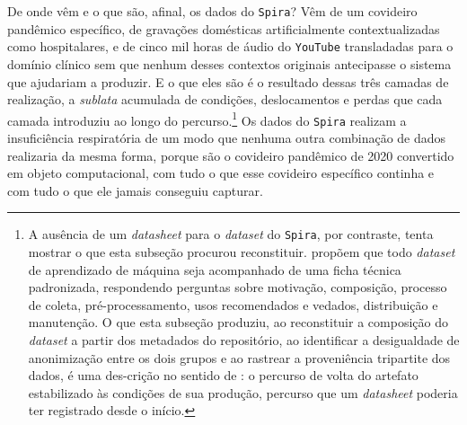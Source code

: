 De onde vêm e o que são, afinal, os dados do \texttt{Spira}? Vêm de um covideiro pandêmico específico, de gravações domésticas artificialmente contextualizadas como hospitalares, e de cinco mil horas de áudio do \texttt{YouTube} transladadas para o domínio clínico sem que nenhum desses contextos originais antecipasse o sistema que ajudariam a produzir. E o que eles são é o resultado dessas três camadas de realização, a \textit{sublata} acumulada de condições, deslocamentos e perdas que cada camada introduziu ao longo do percurso.\footnote{A ausência de um \textit{datasheet} para o \textit{dataset} do \texttt{Spira}, por contraste, tenta mostrar o que esta subseção procurou reconstituir. \textcite{Gebru2021Datasheets} propõem que todo \textit{dataset} de aprendizado de máquina seja acompanhado de uma ficha técnica padronizada, respondendo perguntas sobre motivação, composição, processo de coleta, pré-processamento, usos recomendados e vedados, distribuição e manutenção. O que esta subseção produziu, ao reconstituir a composição do \textit{dataset} a partir dos metadados do repositório, ao identificar a desigualdade de anonimização entre os dois grupos e ao rastrear a proveniência tripartite dos dados, é uma des-crição no sentido de \textcite{Akrich1992Description}: o percurso de volta do artefato estabilizado às condições de sua produção, percurso que um \textit{datasheet} poderia ter registrado desde o início.} Os dados do \texttt{Spira} realizam a insuficiência respiratória de um modo que nenhuma outra combinação de dados realizaria da mesma forma, porque são o covideiro pandêmico de 2020 convertido em objeto computacional, com tudo o que esse covideiro específico continha e com tudo o que ele jamais conseguiu capturar.

